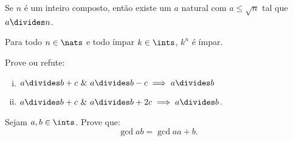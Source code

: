 \begin{exercise}
	Se $n$ é um inteiro composto, então existe um $a$ natural com $a \leq \sqrt n$ tal que $a \divides n$.
\end{exercise}

\begin{exercise}
	Para todo $n \in \nats$ e todo ímpar $k \in \ints$, $k^n$ é ímpar.
\end{exercise}

\begin{exercise}
	Prove ou refute:
		\begin{enumerate}[(i)]
			\item $a \divides b + c \ \&\ a \divides b - c \implies a \divides b$
			\item $a \divides b + c \ \&\ a \divides b + 2c \implies a \divides b$.
		\end{enumerate}
\end{exercise}

\begin{exercise}
	Sejam $a,b \in \ints$. Prove que:
	$$
	\gcd a b = \gcd a {a+b}.
	$$
\end{exercise}
